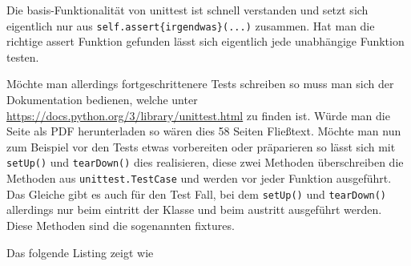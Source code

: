 

Die basis-Funktionalität von unittest ist schnell verstanden und setzt sich
eigentlich nur aus \lstinline|self.assert{irgendwas}(...)| zusammen. Hat man die
richtige assert Funktion gefunden lässt sich eigentlich jede unabhängige
Funktion testen.

Möchte man allerdings fortgeschrittenere Tests schreiben so muss man sich der
Dokumentation bedienen, welche unter \url{https://docs.python.org/3/library/unittest.html}
zu finden ist. Würde man die Seite als PDF herunterladen so wären dies 58
Seiten Fließtext. Möchte man nun zum Beispiel vor den Tests etwas vorbereiten
oder präparieren so lässt sich mit \lstinline|setUp()| und \lstinline|tearDown()| dies realisieren,
diese zwei Methoden überschreiben die Methoden aus \lstinline|unittest.TestCase| und
werden vor jeder Funktion ausgeführt. Das Gleiche gibt es auch für den Test Fall, bei dem
\lstinline|setUp()| und \lstinline|tearDown()| allerdings nur beim eintritt der Klasse und beim
austritt ausgeführt werden. Diese Methoden sind die sogenannten \Glspl{fixture}.

Das folgende Listing zeigt wie